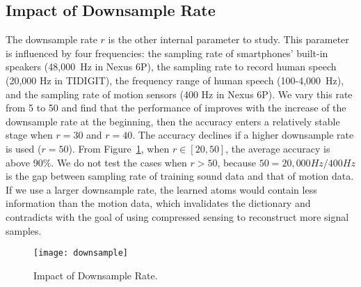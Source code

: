 
\subsection{Impact of Downsample Rate}\label{sec:impact:downrate}
The downsample rate $r$ is the other internal parameter to study. This parameter is influenced by four frequencies: the sampling rate of smartphones' built-in speakers (48,000~Hz in Nexus 6P), the sampling rate to record human speech (20,000 Hz in TIDIGIT), the frequency range of human speech (100-4,000~Hz), and the sampling rate of motion sensors (400 Hz in Nexus 6P). 
%
We vary this rate from 5 to 50 and find that the performance of {\systemName}  improves with the increase of the downsample rate at the beginning, then the accuracy enters a relatively stable stage when $r=30$ and $r=40$. The accuracy declines if a higher downsample rate is used ($r=50$). From Figure~\ref{fig:downsample}, when  $r \in [20, 50]$, the average accuracy is above 90\%. 
%
We do not test the cases when $r > 50$, because $50 = 20,000 Hz / 400 Hz$ is the gap between sampling rate of training sound data and that of motion data.  If we use a larger downsample rate, the learned atoms would contain less information than the motion data, which invalidates the dictionary and contradicts with the goal of using compressed sensing to reconstruct more signal samples. 

\begin{figure}[h]
	\centering
	\texttt{[image: downsample]}
	\vspace{-.1in}
	\caption{Impact of Downsample Rate.}
	\label{fig:downsample}
		\vspace{-.1in}
\end{figure}

